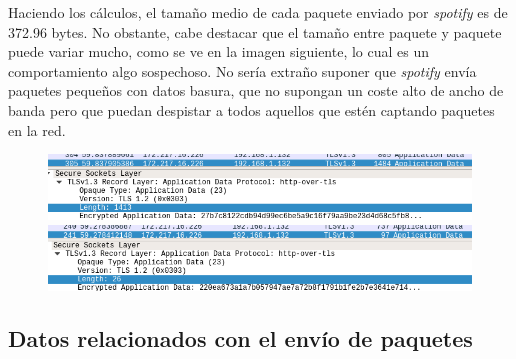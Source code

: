 \documentclass[11pt,a4paper]{article}
\begin{document}
Haciendo los cálculos, el tamaño medio de cada paquete enviado por \textit{spotify} es de 372.96 bytes. No obstante, cabe destacar que el tamaño entre paquete y paquete puede variar mucho, como se ve en la imagen siguiente, lo cual es un comportamiento algo sospechoso. No sería extraño suponer que \textit{spotify} envía paquetes pequeños con datos basura, que no supongan un coste alto de ancho de banda pero que puedan despistar a todos aquellos que estén captando paquetes en la red.

\begin{figure}[H]
	\centering
	\includegraphics[scale=0.3]{img/paquete-grande.png}
	\includegraphics[scale=0.3]{img/paquete-smol.png}
\end{figure}

\subsection*{Datos relacionados con el envío de paquetes}
\end{document}
